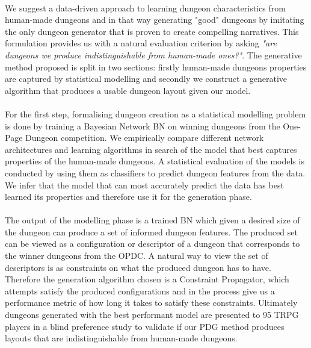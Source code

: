 \documentclass{UoYCSproject}
\begin{document}
\begin{summary}
\paragraph{}
We suggest a data-driven approach to learning dungeon characteristics from human-made dungeons and in that way generating "good" dungeons by imitating the only dungeon generator that is proven to create compelling narratives. This formulation provides us with a natural evaluation criterion by asking \textit{"are dungeons we produce indistinguishable from human-made ones?"}.
The generative method proposed is split in two sections: firstly human-made dungeons properties are captured by statistical modelling and secondly we construct a generative algorithm that produces a usable dungeon layout given our model.

\paragraph{}
For the first step, formalising dungeon creation as a statistical modelling problem is done by training a Bayesian Network BN on winning dungeons from the One-Page Dungeon competition. We empirically compare different network architectures and learning algorithms in search of the model that best captures properties of the human-made dungeons. A statistical evaluation of the models is conducted by using them as classifiers to predict dungeon features from the data. We infer that the model that can most accurately predict the data has best learned its properties and therefore use it for the generation phase.

\paragraph{}
The output of the modelling phase is a trained BN which given a desired size of the dungeon can produce a set of informed dungeon features. The produced set can be viewed as a configuration or descriptor of a dungeon that corresponds to the winner dungeons from the OPDC.
A natural way to view the set of descriptors is as constraints on what the produced dungeon has to have. Therefore the generation algorithm chosen is a Constraint Propagator, which attempts satisfy the produced configurations and in the process give us a performance metric of how long it takes to satisfy these constraints. Ultimately dungeons generated with the best performant model are presented to 95 TRPG players in a blind preference study to validate if our PDG method produces layouts that are indistinguishable from human-made dungeons.


\end{summary}
\end{document}
